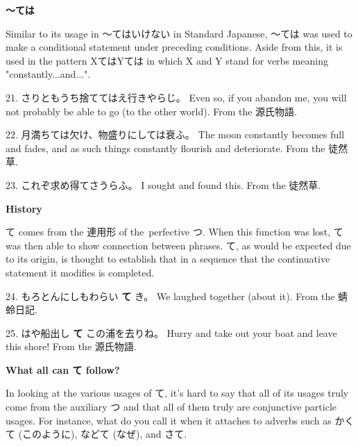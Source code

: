 \begin{center}
\textbf{～ては }
\end{center}

\par{ Similar to its usage in ～てはいけない in Standard Japanese, ～ては was used to make a conditional statement under preceding conditions. Aside from this, it is used in the pattern XてはYては in which X and Y stand for verbs meaning "constantly\dothyp{}\dothyp{}\dothyp{}and\dothyp{}\dothyp{}\dothyp{}". }

\par{21. さりともうち捨ててはえ行きやらじ。 \hfill\break
Even so, if you abandon me, you will not probably be able to go (to the other world). \hfill\break
From the 源氏物語. }

\par{22. 月満ちては欠け、物盛りにしては衰ふ。 \hfill\break
The moon constantly becomes full and fades, and as such things constantly flourish and deteriorate. \hfill\break
From the 徒然草. }

\par{23. これぞ求め得てさうらふ。 \hfill\break
I sought and found this. \hfill\break
From the 徒然草. }

\begin{center}
 \textbf{History }
\end{center}

\par{ て comes from the 連用形 of the perfective つ. When this function was lost, て was then able to show connection between phrases. て, as would be expected due to its origin, is thought to establish that in a sequence that the continuative statement it modifies is completed. }

\par{24. もろとんにしもわらい \textbf{て }き。 \hfill\break
We laughed together (about it). \hfill\break
From the 蜻蛉日記. }

\par{25. はや船出し \textbf{て }この浦を去りね。 \hfill\break
Hurry and take out your boat and leave this shore! \hfill\break
From the 源氏物語. }

\begin{center}
\textbf{What all can て follow? }
\end{center}

\par{ In looking at the various usages of て, it's hard to say that all of its usages truly come from the auxiliary つ and that all of them truly are conjunctive particle usages. For instance, what do you call it when it attaches to adverbs such as かくて (このように), などて (なぜ), and さて. }

